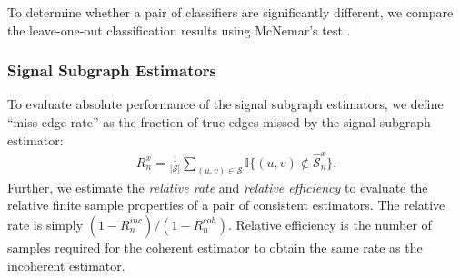\documentclass[10pt,journal,cspaper,compsoc]{IEEEtran}
\newcommand{\GG}{\mathbb{G}}
\newcommand{\EE}{\mathbb{E}}           %
\newcommand{\II}{\mathbb{I}}           %
\providecommand{\mc}[1]{\mathcal{#1}}
\providecommand{\mhc}[1]{\widehat{\mathcal{#1}}}
\begin{document}
To determine whether a pair of classifiers are significantly different, we compare the leave-one-out classification results using McNemar's test \cite{McNemar1947}.


\subsubsection{Signal Subgraph Estimators} %
\label{ssub:signal_subgraph_estimators}


To evaluate absolute performance of the signal subgraph estimators, we define  ``miss-edge rate'' as the fraction of true edges missed by the signal subgraph estimator:
\begin{align}
R^x_n = \frac{1}{|\mc{S}|} \sum_{(u,v)\in \mc{S}}\II\{(u,v) \notin \mhc{S}^x_n\}.
\end{align}
Further, we estimate the \emph{relative rate} and \emph{relative efficiency} to evaluate the relative finite sample properties of a pair of consistent estimators. The relative rate is simply $(1-R^{inc}_n)/(1-R^{coh}_n)$.  Relative efficiency is the number of samples required for the coherent estimator to obtain the same rate as the incoherent estimator.


% 




% 
% 
% 
% 
% 
\end{document}
